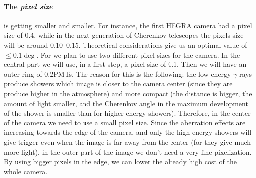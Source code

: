 \paragraph{The \emph{pixel size}} is getting smaller and smaller. For
instance, the first HEGRA camera had a pixel size of 0.4\deg, while in
the next generation of Cherenkov telescopes the pixels size will be
around 0.10\deg--0.15\deg. Theoretical considerations give us an
optimal value of $\leq 0.1\deg$. For \MAGIC we plan to use two
different pixel sizes for the camera. In the central part we will use,
in a first step, a pixel size of 0.1\deg. Then we will have an outer
ring of 0.2\deg PMTs. The reason for this is the following: the
low-energy $\gamma$-rays produce showers which image is closer to the
camera center (since they are produce higher in the atmosphere) and
more compact (the distance is bigger, the amount of light smaller, and
the Cherenkov angle in the maximum development of the shower is
smaller than for higher-energy showers). Therefore, in the center of
the camera we need to use a small pixel size. Since the aberration
effects are increasing towards the edge of the camera, and only the
high-energy showers will give trigger even when the image is far away
from the center (for they give much more light), in the outer part of
the image we don't need a very fine pixelization. By using bigger
pixels in the edge, we can lower the already high cost of the whole
camera.

\mirrorsandwichfig


